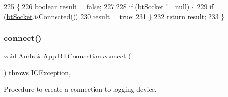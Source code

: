 \begin{DoxyCode}
225                                  \{
226         \textcolor{keywordtype}{boolean} result = \textcolor{keyword}{false};
227 
228         \textcolor{keywordflow}{if} (\hyperlink{class_android_app_1_1_b_t_connection_af3cdc6c880b28361d87d0118ace0e49c}{btSocket} != null) \{
229             \textcolor{keywordflow}{if} (\hyperlink{class_android_app_1_1_b_t_connection_af3cdc6c880b28361d87d0118ace0e49c}{btSocket}.isConnected())
230                 result = \textcolor{keyword}{true};
231         \}
232         \textcolor{keywordflow}{return} result;
233     \}
\end{DoxyCode}
\mbox{\label{class_android_app_1_1_b_t_connection_a1dfc9451ba1b40089f17ee081486602e}} 
\subsubsection{\texorpdfstring{connect()}{connect()}}
{\footnotesize\ttfamily void Android\+App.\+B\+T\+Connection.\+connect (\begin{DoxyParamCaption}{ }\end{DoxyParamCaption}) throws I\+O\+Exception\hspace{0.3cm}{\ttfamily [inline]}, {\ttfamily [private]}}



Procedure to create a connection to logging device. 

